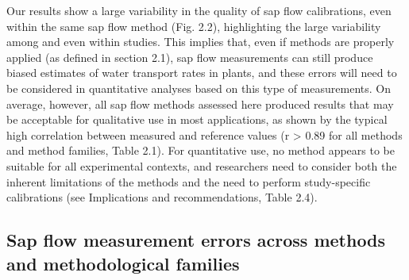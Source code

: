 \documentclass[11pt,twoside]{reedthesis}
\begin{document}
Our results show a large variability in the quality of sap flow
calibrations, even within the same sap flow method (Fig. 2.2),
highlighting the large variability among and even within studies. This
implies that, even if methods are properly applied (as defined in
section 2.1), sap flow measurements can still produce biased estimates
of water transport rates in plants, and these errors will need to be
considered in quantitative analyses based on this type of measurements.
On average, however, all sap flow methods assessed here produced results
that may be acceptable for qualitative use in most applications, as
shown by the typical high correlation between measured and reference
values (r \textgreater{} 0.89 for all methods and method families, Table
2.1). For quantitative use, no method appears to be suitable for all
experimental contexts, and researchers need to consider both the
inherent limitations of the methods and the need to perform
study-specific calibrations (see Implications and recommendations, Table
2.4).\par

\subsection{Sap flow measurement errors across methods and
methodological
families}\label{sap-flow-measurement-errors-across-methods-and-methodological-families}
\end{document}
